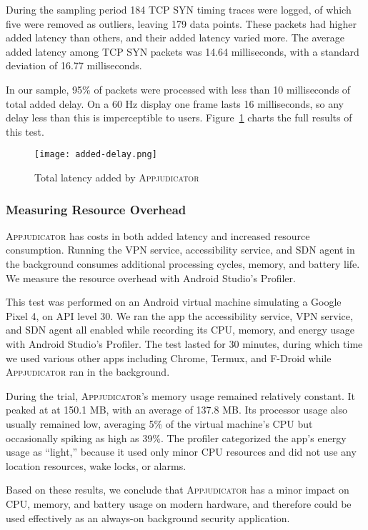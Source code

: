 During the sampling period 184 TCP SYN timing traces were logged, of which five
were removed as outliers, leaving 179 data points. These packets had 
higher added latency than others, and their added latency varied more. The
average added latency among TCP SYN packets was 14.64 milliseconds, with a
standard deviation of 16.77 milliseconds.

In our sample, 95\% of packets were processed with less than 10 milliseconds
of total added delay. On a 60 Hz display one frame lasts 16 milliseconds, so any
delay less than this is imperceptible to users.
Figure~\ref{fig:added-delay-chart} charts the full results of this test.

\begin{figure}[h]
    \centering
	\texttt{[image: added-delay.png]}
	\caption{Total latency added by \textsc{Appjudicator}}
	\label{fig:added-delay-chart}
\end{figure}

\subsubsection{Measuring Resource Overhead}
\label{sec:measuring-resource-overhead}

\textsc{Appjudicator} has costs in both added latency and increased resource
consumption. Running the VPN service, accessibility service, and SDN agent in
the background consumes additional processing cycles, memory, and battery life.
We measure the resource overhead with Android Studio's
Profiler.~\cite{androidprofiler}

This test was performed on an Android virtual machine simulating a Google Pixel
4, on API level 30. We ran the app the accessibility service, VPN service, and
SDN agent all enabled while recording its CPU, memory, and energy usage with
Android Studio's Profiler. The test lasted for 30 minutes, during which time we
used various other apps including Chrome, Termux, and F-Droid while
\textsc{Appjudicator} ran in the background.

During the trial, \textsc{Appjudicator}'s memory usage remained relatively
constant. It peaked at at 150.1 MB, with an average of 137.8 MB. Its processor
usage also usually remained low, averaging 5\% of the virtual machine's CPU but
occasionally spiking as high as 39\%. The profiler categorized the app's energy
usage as ``light,'' because it used only minor CPU resources and did not use any
location resources, wake locks, or alarms.

Based on these results, we conclude that \textsc{Appjudicator} has a minor
impact on CPU, memory, and battery usage on modern hardware, and therefore could
be used effectively as an always-on background security application.

\newpage

